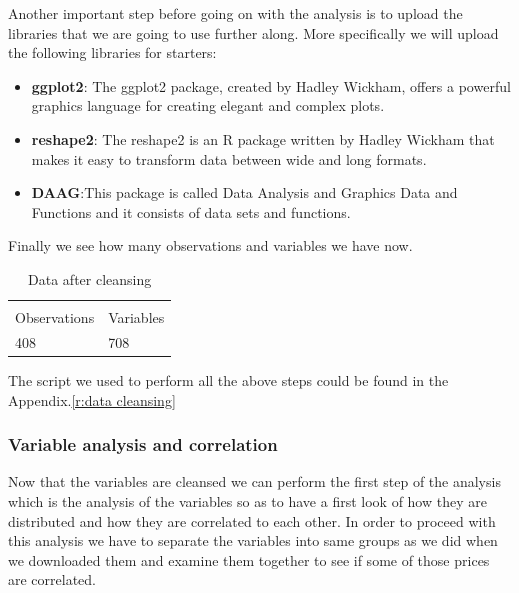 \documentclass{article}
\begin{document}
Another important step before going on with the analysis is to upload the libraries that we are going to use further along. More specifically we will upload the following libraries for starters:
\begin{itemize}
\item \textbf{ggplot2}: The ggplot2 package, created by Hadley Wickham, offers a powerful graphics language for creating elegant and complex plots.
\item \textbf{reshape2}: The reshape2 is an R package written by Hadley Wickham that makes it easy to transform data between wide and long formats.
\item \textbf{DAAG}:This package is called Data Analysis and Graphics Data and Functions and it consists of data sets and functions.
\end{itemize}
Finally we see how many observations and variables we have now.
\begin{table}[H]
\centering
\caption{Data after cleansing}
\begin{tabular}{ll}
  & \\
Observations & Variables \\
408 & 708 \\
\end{tabular}
\end{table}
The script we used to perform all the above steps could be found in the Appendix.\ref{r:data cleansing}
\subsubsection{Variable analysis and correlation}
Now that the variables are cleansed we can perform the first step of the analysis which is the analysis of the variables so as to have a first look of how they are distributed and how they are correlated to each other. In order to proceed with this analysis we have to separate the variables into same groups as we did when we downloaded them and examine them together to see if some of those prices are correlated.
\end{document}
